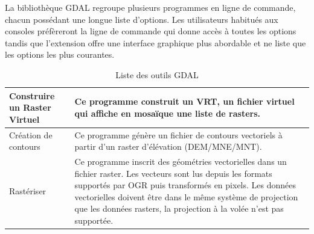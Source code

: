 La bibliothèque GDAL regroupe plusieurs programmes en ligne de commande, chacun possédant une longue liste d'options. Les utilisateurs habitués aux consoles préfèreront la ligne de commande qui donne accès à toutes les options tandis que l'extension offre une interface graphique plus abordable et ne liste que les options les plus courantes. 

{\setlength{\extrarowheight}{15pt}
\begin{longtable}{|p{3cm}|p{13cm}|}
\caption{Liste des outils GDAL}\label{tab:gdaltools} \\
\hline Construire un Raster Virtuel & Ce programme construit un VRT, un fichier virtuel qui affiche en mosaïque une liste de rasters. \\
\hline Création de contours & Ce programme génère un fichier de contours vectoriels à partir d'un raster d'élévation (DEM/MNE/MNT).\\
\hline Rastériser & Ce programme inscrit des géométries vectorielles dans un fichier raster. Les vecteurs sont lus depuis les formats supportés par OGR puis transformés en pixels. Les données vectorielles doivent être dans le même système de projection que les données rasters, la projection à la volée n'est pas supportée.\\

\end{longtable}}
